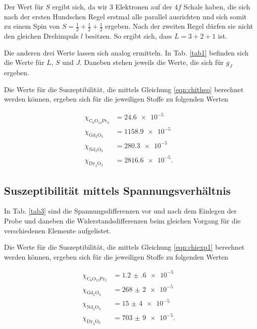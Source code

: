 \noindent Der Wert für $S$ ergibt sich, da wir \num{3} Elektronen auf der $4f$ Schale haben, die sich nach der ersten Hundschen Regel erstmal alle parallel ausrichten und sich somit zu einem Spin von $S = \frac{1}{2}+ \frac{1}{2} + \frac{1}{2}$ ergeben. Nach der zweiten Regel dürfen sie nicht den gleichen Drehimpuls $l$ besitzen. So ergibt sich, dass $L = 3 + 2 + 1$ ist. 

\noindent Die anderen drei Werte lassen sich analog ermitteln. 
In Tab. \ref{tab1} befinden sich die Werte für $L$, $S$ und $J$. Daneben stehen jeweils die Werte, die sich für 
$g_J$ ergeben. 


\noindent Die Werte für die Suszeptibilität, die mittels Gleichung \eqref{eqn:chitheo} berechnet werden können, ergeben sich für die jeweiligen Stoffe 
zu folgenden Werten 

\begin{align*}
   \chi_{\text{C}_6 \text{O}_{12} \text{Pr}_2} &= \num{24.6e-5}\\ %
   \chi_{\text{Gd}_2 \text{O}_3} &= \num{1158.9e-5}\\
   \chi_{\text{Nd}_2 \text{O}_3} &= \num{280.3e-5}\\
   \chi_{\text{Dy}_2 \text{O}_3} &= \num{2816.6e-5}.
\end{align*}

\subsection{Suszeptibilität mittels Spannungsverhältnis}
In Tab. \ref{tab3} sind die Spannungsdifferenzen vor und nach dem Einlegen der Probe und daneben die Widerstandsdifferenzen beim gleichen Vorgang für die verschiedenen Elemente aufgelistet.


\noindent Die Werte für die Suszeptibilität, die mittels Gleichung \eqref{eqn:chiexp1} berechnet werden können, ergeben sich für die jeweiligen Stoffe 
zu folgenden Werten 

\begin{align*} 
   \chi_{\text{C}_6 \text{O}_{12} \text{Pr}_2} &= \num{1.2(6)e-5}\\ %
   \chi_{\text{Gd}_2 \text{O}_3} &= \num{268(2)e-5}\\
   \chi_{\text{Nd}_2 \text{O}_3} &= \num{15(4)e-5}\\
   \chi_{\text{Dy}_2 \text{O}_3} &= \num{703(9)e-5}.
\end{align*}


